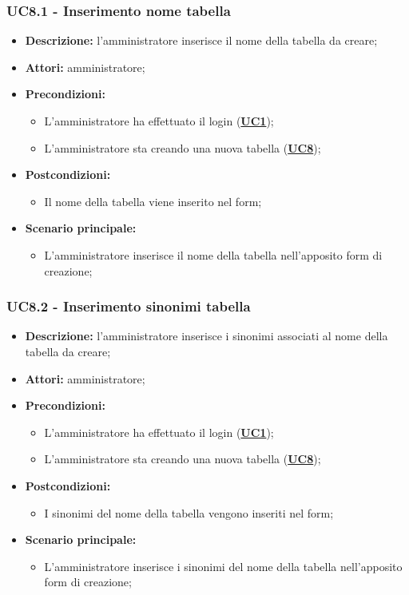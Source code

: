 \documentclass[5pt]{article}
\begin{document}
\subsubsection{UC8.1 - Inserimento nome tabella}
\label{sec:UC8.1}
\begin{itemize}
	\item \textbf{Descrizione:} l’amministratore inserisce il nome della tabella da creare;
	\item \textbf{Attori:} amministratore;
	\item \textbf{Precondizioni:} 
	\begin{itemize}
		\item L’amministratore ha effettuato il login (\hyperref[sec:UC1]{\textbf{UC1}});
		\item L’amministratore sta creando una nuova tabella (\hyperref[sec:UC1]{\textbf{UC8}});
	\end{itemize}
	\item \textbf{Postcondizioni:} 
	\begin{itemize}
		\item Il nome della tabella viene inserito nel form;
	\end{itemize}
	\item \textbf{Scenario principale:} 
	\begin{itemize}
		\item L’amministratore inserisce il nome della tabella nell'apposito form di creazione;
	\end{itemize}
\end{itemize}

\subsubsection{UC8.2 - Inserimento sinonimi tabella}
\label{sec:UC8.2}
\begin{itemize}
	\item \textbf{Descrizione:} l’amministratore inserisce i sinonimi associati al nome della tabella da creare;
	\item \textbf{Attori:} amministratore;
	\item \textbf{Precondizioni:} 
	\begin{itemize}
		\item L’amministratore ha effettuato il login (\hyperref[sec:UC1]{\textbf{UC1}});
		\item L’amministratore sta creando una nuova tabella (\hyperref[sec:UC1]{\textbf{UC8}});
	\end{itemize}
	\item \textbf{Postcondizioni:} 
	\begin{itemize}
		\item I sinonimi del nome della tabella vengono inseriti nel form;
	\end{itemize}
	\item \textbf{Scenario principale:} 
	\begin{itemize}
		\item L’amministratore inserisce i sinonimi del nome della tabella nell'apposito form di creazione;
	\end{itemize}
\end{itemize}
\end{document}
